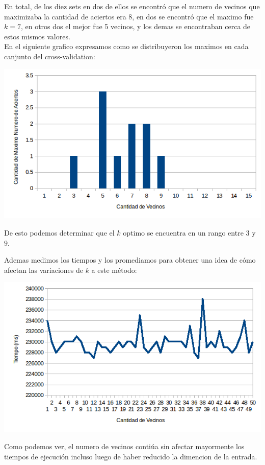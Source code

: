 En total, de los diez sets en dos de ellos se encontró que el numero de vecinos que maximizaba la cantidad de aciertos era 8, en dos se encontró que el maximo fue $k = 7$, en otros dos el mejor fue 5 vecinos, y los demas se encontraban cerca de estos mismos valores.
\\
En el siguiente grafico expresamos como se distribuyeron los maximos en cada canjunto del cross-validation:
\begin{center}
\includegraphics[scale=0.6]{nuevosResultados/pca/k/mejores.png}\\
\end{center}
De esto podemos determinar que el $k$ optimo se encuentra en un rango entre $3$ y $9$.

Ademas medimos los tiempos y los promediamos para obtener una idea de cómo afectan las variaciones de $k$ a este método:
\begin{center}
\includegraphics[scale=0.6]{nuevosResultados/pca/k/temp.png}\\
\end{center}

Como podemos ver, el numero de vecinos contiúa sin afectar mayormente los tiempos de ejecución incluso luego de haber reducido la dimencion de la entrada.


